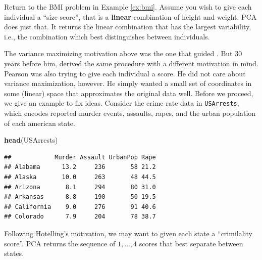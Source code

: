 \documentclass[]{book}
\newenvironment{Shaded}{\begin{snugshade}}{\end{snugshade}}
\newcommand{\KeywordTok}[1]{\textcolor[rgb]{0.13,0.29,0.53}{\textbf{{#1}}}}
\newcommand{\DataTypeTok}[1]{\textcolor[rgb]{0.13,0.29,0.53}{{#1}}}
\newcommand{\DecValTok}[1]{\textcolor[rgb]{0.00,0.00,0.81}{{#1}}}
\newcommand{\FloatTok}[1]{\textcolor[rgb]{0.00,0.00,0.81}{{#1}}}
\newcommand{\StringTok}[1]{\textcolor[rgb]{0.31,0.60,0.02}{{#1}}}
\newcommand{\CommentTok}[1]{\textcolor[rgb]{0.56,0.35,0.01}{\textit{{#1}}}}
\newcommand{\OtherTok}[1]{\textcolor[rgb]{0.56,0.35,0.01}{{#1}}}
\newcommand{\NormalTok}[1]{{#1}}
\theoremstyle{definition}
\theoremstyle{definition}
\theoremstyle{remark}
\begin{document}
Return to the BMI problem in Example \ref{ex:bmi}. Assume you wish to
give each individual a ``size score'', that is a \textbf{linear}
combination of height and weight: PCA does just that. It returns the
linear combination that has the largest variability, i.e., the
combination which best distinguishes between individuals.

The variance maximizing motivation above was the one that guided
\citet{hotelling1933analysis}. But \(30\) years before him,
\citet{pearson1901liii} derived the same procedure with a different
motivation in mind. Pearson was also trying to give each individual a
score. He did not care about variance maximization, however. He simply
wanted a small set of coordinates in some (linear) space that
approximates the original data well. Before we proceed, we give an
example to fix ideas. Consider the crime rate data in
\texttt{USArrests}, which encodes reported murder events, assaults,
rapes, and the urban population of each american state.

\begin{Shaded}
\begin{Highlighting}[]
\KeywordTok{head}\NormalTok{(USArrests)}
\end{Highlighting}
\end{Shaded}

\begin{verbatim}
##            Murder Assault UrbanPop Rape
## Alabama      13.2     236       58 21.2
## Alaska       10.0     263       48 44.5
## Arizona       8.1     294       80 31.0
## Arkansas      8.8     190       50 19.5
## California    9.0     276       91 40.6
## Colorado      7.9     204       78 38.7
\end{verbatim}

Following Hotelling's motivation, we may want to given each state a
``crimilality score''. PCA returns the sequence of \(1,\dots,4\) scores
that best separate between states.

\begin{Shaded}
\end{Shaded}
\end{document}
